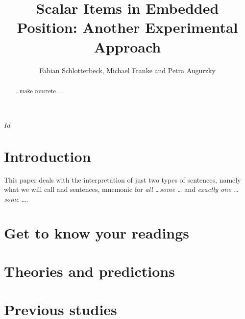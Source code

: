 \documentclass[fleqn,reqno,10pt]{article}
\title{Scalar Items in Embedded Position: {A}nother Experimental Approach}
\author{Fabian Schlotterbeck, Michael Franke and Petra Augurzky}
\date{}
\newcommand{\as}{\acro{as}}
\renewcommand{\es}{\acro{es}}
\begin{document}
\maketitle


\begin{abstract}
  \dots make concrete \dots
\end{abstract}

\svnInfo $Id$

\section{Introduction}
\label{sec:introduction}

This paper deals with the interpretation of just two types of
sentences, namely what we will call \as and \es sentences, mnemonic
for \emph{all \dots some \dots} and \emph{exactly one \dots some
  \dots}.










\bigskip





\section{Get to know your readings}
\label{sec:get-know-your}

\section{Theories and predictions}
\label{sec:theories-predictions}

\section{Previous studies}
\label{sec:previous-studies}





\printbibliography[heading=bibintoc]
\end{document}

